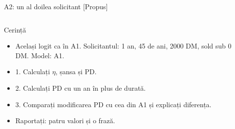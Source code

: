 \begin{frame}{A2: un al doilea solicitant [Propus]}
\propsub
\itemsize{\scriptsize}
\begin{columns}[T]
\begin{column}{\taskw}
\begin{block}{Cerință}
\begin{itemize}
    \item Același logit ca în A1. Solicitantul: 1 an, 45 de ani, 2000 DM, sold sub 0 DM. Model: A1.
    \item 1. Calculați $\eta$, șansa și PD.
    \item 2. Calculați PD cu un an în plus de durată.
    \item 3. Comparați modificarea PD cu cea din A1 și explicați diferența.
    \item Raportați: patru valori și o frază.
\end{itemize}
\end{block}
\end{column}
\begin{column}{\solw}
\end{column}
\end{columns}
\end{frame}

